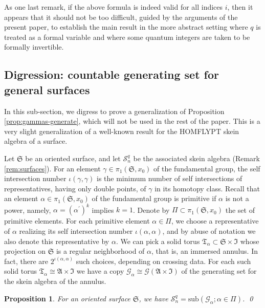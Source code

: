 \documentclass[12pt,
	]{amsart}
\newtheorem{proposition}[theorem]{Proposition}
\theoremstyle{definition}
\newcommand{\mrm}[1]{\mathrm{#1}}
\newcommand{\mcal}[1]{\mathcal{#1}}
\newcommand{\mfrak}[1]{\mathfrak{#1}}
\newcommand{\lp}{\left(}\newcommand{\rp}{\right)}
\newcommand{\sub}[1]{\mrm{sub}\lp#1\rp}
\newcommand{\sk}{\mcal{S}_n^q}
\newcommand{\ann}{\mfrak{A}}
\newcommand{\surf}{\mfrak{S}}
\newcommand{\intt}{\mfrak{I}}
\newcommand{\gen}{\mcal{G}}
\newcommand{\tor}{\mfrak{T}}
\begin{document}
As one last remark, if the above formula is indeed valid for all indices $i$, then it appears that it should not be too difficult, guided by the arguments of the present paper, to establish the main result in the more abstract setting where $q$ is treated as a formal variable and where some quantum integers are taken to be formally invertible.

\subsection{Digression:  countable generating set for general surfaces}\label{ssec:a-result-for-general-surfaces}

In this sub-section, we digress to prove a generalization of Proposition \ref{prop:gammas-generate}, which will not be used in the rest of the paper.  This is a very slight generalization of a well-known result for the HOMFLYPT skein algebra \cite{turaevMR0964255} of a surface.  %

Let $\surf$ be an oriented surface, and let $\sk$ be the associated skein algebra (Remark \ref{rem:surfaces}).  For an element $\gamma\in\pi_1(\surf,x_0)$ of the fundamental group, the self intersection number $\iota(\gamma,\gamma)$ is the minimum number of self intersections of representatives, having only double points, of $\gamma$ in its homotopy class.  Recall that an element $\alpha\in\pi_1(\surf,x_0)$ of the fundamental group is primitive if $\alpha$ is not a power, namely, $\alpha=(\alpha^\prime)^k$ implies $k=1$.  Denote by $\Pi\subset\pi_1(\surf,x_0)$ the set of primitive elements.  For each primitive element $\alpha\in\Pi$, we choose a representative of $\alpha$ realizing its self intersection number $\iota(\alpha,\alpha)$, and by abuse of notation we also denote this representative by $\alpha$.  We can pick a solid torus $\tor_\alpha\subset\surf\times\intt$ whose projection on $\surf$ is a regular neighborhood of $\alpha$, that is, an immersed annulus.  In fact, there are $2^{\iota(\alpha,\alpha)}$ such choices, depending on crossing data.  For each such solid torus $\tor_\alpha\cong\ann\times\intt$ we have a copy $\gen_\alpha\cong\gen(\ann\times\intt)$ of the generating set for the skein algebra of the annulus.   

\begin{proposition}\label{prop:gensurf} 
For an oriented surface $\surf$, we have $\sk=\sub{\gen_\alpha;\alpha\in\Pi}$.  \qed
\end{proposition} 
\end{document}
